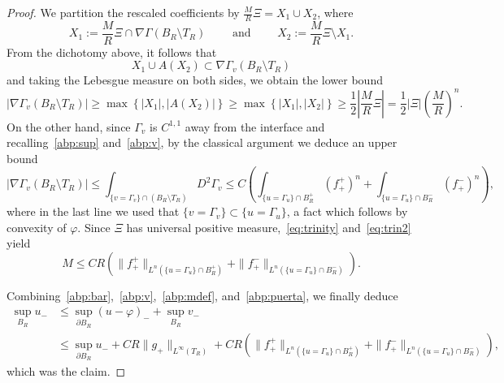 \documentclass[10pt,a4paper]{amsart}
\begin{document}
\begin{proof}
We partition the rescaled coefficients by $\frac{M}{R}\Xi = X_1 \cup X_2$, where
\[
X_1 := \textstyle\frac{M}{R}\Xi
\cap \nabla \Gamma(B_R \setminus T_R)
\qquad \text{ and } \qquad 
X_2 := \textstyle \frac{M}{R}\Xi \setminus X_1.
\]
From the dichotomy above, it follows that
\[
X_1 \cup A(X_2) \subset \nabla \Gamma_{v}(B_R \setminus T_R)
\]
and taking the Lebesgue measure on both sides, we obtain the lower bound
\begin{equation}
\label{eq:trinity}
|\nabla \Gamma_{v}(B_R \setminus T_R)| \geq \max\left\{|X_1|, |A(X_2)| \right\} \geq \max\left\{|X_1|, |X_2| \right\} \geq \frac{1}{2}\left|\frac{M}{R}\Xi\right| = \frac{1}{2} |\Xi| \left(\frac{M}{R}\right)^{n}.
\end{equation}
On the other hand, since $\Gamma_v$ is $C^{1,1}$ away from the interface and recalling~\eqref{abp:sup} and~\eqref{abp:v}, by the classical argument we deduce an upper bound
\begin{equation}
\label{eq:trin2}
|\nabla \Gamma_{v}(B_R \setminus T_R)|
\leq \int_{\{v = \Gamma_v\}\cap (B_R\setminus T_R)} D^2 \Gamma_{v}
\leq C \left( \int_{\{u = \Gamma_u\}\cap B_R^{+}} (f_{+}^{+})^{n} 
+ \int_{\{u = \Gamma_u\}\cap B_R^{-}} (f_{+}^{-})^{n}
\right),
\end{equation}
where in the last line we used that $\{v = \Gamma_v\} \subset \{u = \Gamma_u\}$, a fact which follows by convexity of $\varphi$.
Since $\Xi$ has universal positive measure,~\eqref{eq:trinity} and~\eqref{eq:trin2} yield
\begin{equation}
\label{abp:puerta}
M \leq C R \left(\|f_{+}^{+}\|_{L^{n}(\{u = \Gamma_{u}\}\cap B_R^{+} )} + \|f_{+}^{-}\|_{L^{n}(\{u = \Gamma_{u}\}\cap B_R^{-} )}\right).
\end{equation}

\medskip

Combining~\eqref{abp:bar},~\eqref{abp:v},~\eqref{abp:mdef}, and~\eqref{abp:puerta}, we finally deduce
\[
\begin{split}
\sup_{B_R} u_{-}
&\leq \sup_{\partial B_R} (u-\varphi)_{-} + \sup_{B_R} v_{-}\\
&\leq \sup_{\partial B_R} u_{-}+ C R \|g_{+}\|_{L^{\infty}(T_R)} + C R \left(  
\|f_{+}^{+}\|_{L^{n}(\{u = \Gamma_{u}\}\cap B_R^{+} )} + \|f_{+}^{-}\|_{L^{n}(\{u = \Gamma_{u}\}\cap B_R^{-} )}
\right),
\end{split}
\]
which was the claim.
\end{proof}
\end{document}
